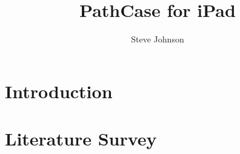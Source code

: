 \documentclass[twocolumn, 12pt]{report}
\title{PathCase for iPad}
\author{Steve Johnson}
\begin{document}
\maketitle

\tableofcontents

% 

\chapter{Introduction}
\label{ch:introduction}


\chapter{Literature Survey}
\label{ch:literature_survey}




\end{document}
